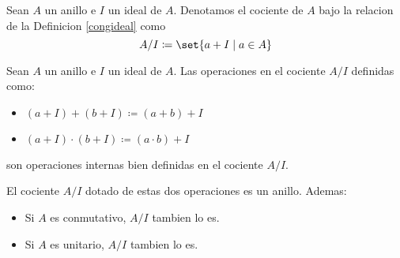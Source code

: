 \begin{definition}
	Sean \(A \) un anillo e \(I \) un ideal de \(A \). Denotamos el cociente de \(A \) bajo la relacion de la Definicion \ref{congideal} como
	\[
		A/I \coloneqq \set{a + I \mid a \in A }
	\]
\end{definition}
\begin{proposition}
	Sean \(A \) un anillo e \(I \) un ideal de \(A \). Las operaciones en el cociente \(A/I \) definidas como:
	\begin{itemize}
		\item \((a + I) + (b + I) \coloneqq (a+b) + I \)
		\item \((a + I) \cdot (b + I ) \coloneqq (a \cdot b) + I\)
		      
	\end{itemize}
	son operaciones internas bien definidas en el cociente \(A/I . \)
	
	El cociente \(A/I\) dotado de estas dos operaciones es un anillo. Ademas:
	\begin{itemize}
		\item Si \(A \) es conmutativo, \(A/I \) tambien lo es.
		\item Si \(A \) es unitario, \(A/I \) tambien lo es.
	\end{itemize}
\end{proposition}
